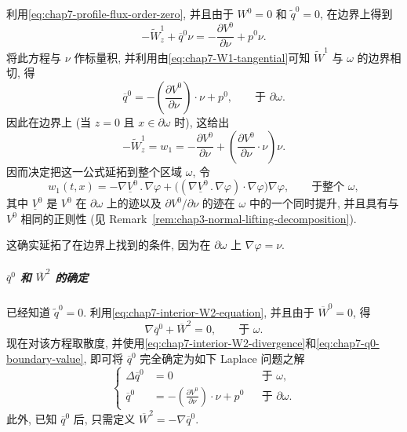 \begin{sloppypar}
利用\eqref{eq:chap7-profile-flux-order-zero}, 并且由于 $W^0=0$ 和 $\widetilde q^0=0$, 在边界上得到
\[
 -\widetilde W^1_z+\overline q^0\nu
 =-\frac{\partial V^0}{\partial\nu}+p^0\nu.
\]
将此方程与 $\nu$ 作标量积, 并利用由\eqref{eq:chap7-W1-tangential}可知 $\widetilde W^1$ 与 $\omega$ 的边界相切, 得
\begin{equation}
 \overline q^0=-\left(\frac{\partial V^0}{\partial\nu}\right)\cdot\nu+p^0,
 \qquad\text{于 }\partial\omega.
\label{eq:chap7-q0-boundary-value}
\end{equation}
因此在边界上 (当 $z=0$ 且 $x\in\partial\omega$ 时), 这给出
\[
 -\widetilde W^1_z=w_1
 =-\frac{\partial V^0}{\partial\nu}
 +\left(\frac{\partial V^0}{\partial\nu}\cdot\nu\right)\nu.
\]
因而决定把这一公式延拓到整个区域 $\omega$, 令
\begin{equation}
 w_1(t,x)=-\nabla\underline V^0\mathbin{.}\nabla\varphi
 +\bigl((\nabla\underline V^0\mathbin{.}\nabla\varphi)\cdot\nabla\varphi\bigr)\nabla\varphi,
 \qquad\text{于整个 }\omega,
\label{eq:chap7-w1-extension}
\end{equation}
其中 $\underline V^0$ 是 $V^0$ 在 $\partial\omega$ 上的迹以及 $\partial V^0/\partial\nu$ 的迹在 $\omega$ 中的一个同时提升, 并且具有与 $V^0$ 相同的正则性 (见 Remark~\ref{rem:chap3-normal-lifting-decomposition}).

这确实延拓了在边界上找到的条件, 因为在 $\partial\omega$ 上 $\nabla\varphi=\nu$.

\subparagraph{$\overline q^0$ 和 $\overline W^2$ 的确定}

已经知道 $\widetilde q^0=0$. 利用\eqref{eq:chap7-interior-W2-equation}, 并且由于 $\overline W^0=0$, 得
\begin{equation}
 \nabla\overline q^0+\overline W^2=0,
 \qquad\text{于 }\omega.
\label{eq:chap7-q0-W2-relation}
\end{equation}
现在对该方程取散度, 并使用\eqref{eq:chap7-interior-W2-divergence}和\eqref{eq:chap7-q0-boundary-value}, 即可将 $\overline q^0$ 完全确定为如下 Laplace 问题之解
\begin{equation}
\left\{
\begin{aligned}
 \Delta\overline q^0&=0&&\text{于 }\omega,\\
 \overline q^0&=-\left(\frac{\partial V^0}{\partial\nu}\right)\cdot\nu+p^0
 &&\text{于 }\partial\omega.
\end{aligned}
\right.
\label{eq:chap7-q0-laplace-problem}
\end{equation}
此外, 已知 $\overline q^0$ 后, 只需定义 $\overline W^2=-\nabla\overline q^0$.


\end{sloppypar}
